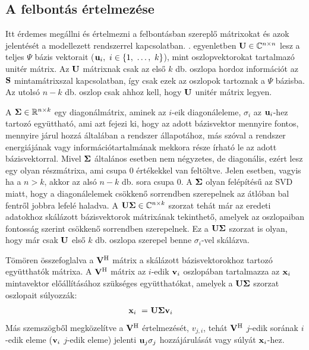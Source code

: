         \subsection{A felbontás értelmezése}
            Itt érdemes megállni és értelmezni a felbontásban szereplő mátrixokat és azok jelentését a modellezett rendszerrel kapcsolatban. . egyenletben ${\bf U} \in \mathbb{C}^{n\times n}$ lesz a teljes $\Psi$ bázis vektorait (${\bf u}_i,~i \in \{1,~\hdots,~k\}$), mint oszlopvektorokat tartalmazó unitér mátrix. Az ${\bf U}$ mátrixnak csak az első $k$ db. oszlopa hordoz információt az ${\bf S}$ mintamátrixszal kapcsolatban, így csak ezek az oszlopok tartoznak a $\Psi$ bázisba. Az utolsó $n-k$ db. oszlop csak ahhoz kell, hogy ${\bf U}$ unitér mátrix legyen.
            \par
            A ${\bf \Sigma} \in \mathbb{R}^{n\times k}$ egy diagonálmátrix, aminek az $i$-eik diagonáleleme, $\sigma_i$ az ${\bf u}_i$-hez tartozó együttható, ami azt fejezi ki, hogy az adott bázisvektor mennyire fontos, mennyire járul hozzá általában a rendszer állapotához, más szóval a rendszer energiájának vagy információtartalmának mekkora része írható le az adott bázisvektorral. Mivel ${\bf \Sigma}$ általános esetben nem négyzetes, de diagonális, ezért lesz egy olyan részmátrixa, ami csupa 0 értékekkel van feltöltve. Jelen esetben, vagyis ha a $n > k$, akkor az alsó $n-k$ db. sora csupa 0. A ${\bf \Sigma}$ olyan felépítésű az SVD miatt, hogy a diagonálelemek csökkenő sorrendben szerepelnek az átlóban bal fentről jobbra lefelé haladva. A ${\bf U\Sigma} \in \mathbb{C}^{n\times k}$ szorzat tehát már az eredeti adatokhoz skálázott bázisvektorok mátrixának tekinthető, amelyek az oszlopaiban fontosság szerint csökkenő sorrendben szerepelnek. Ez a ${\bf U\Sigma}$ szorzat is olyan, hogy már csak ${\bf U}$ első $k$ db. oszlopa szerepel benne $\sigma_i$-vel skálázva.
            \par
            Tömören összefoglalva a ${\bf V^{\mathrm{H}}}$ mátrix a skálázott bázisvektorokhoz tartozó együtthatók mátrixa. A ${\bf V^{\mathrm{H}}}$ mátrix az $i$-edik ${\bf v}_i$ oszlopában tartalmazza az ${\bf x}_i$ mintavektor előállításához szükséges együtthatókat, amelyek a ${\bf U\Sigma}$ szorzat oszlopait súlyozzák:
            \begin{align}
                {\bf x}_i~=&~{\bf U\Sigma v}_i
            \end{align}
            Más szemszögből megközelítve a ${\bf V^{\mathrm{H}}}$ értelmezését, $v_{j,i}$, tehát ${\bf V^{\mathrm{H}}}$ $j$-edik sorának $i$-edik eleme (${\bf v}_i$ $j$-edik eleme) jelenti ${\bf u}_j \sigma_j$ hozzájárulását vagy súlyát ${\bf x}_i$-hez.
